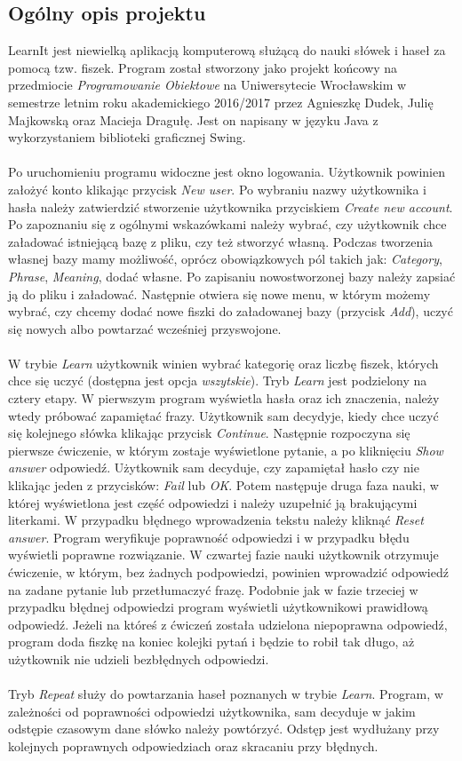 \documentclass[11pt]{article}
\begin{document}
\subsection{Ogólny opis projektu}
LearnIt jest niewielką aplikacją komputerową służącą do nauki słówek i haseł za pomocą tzw. fiszek. Program został stworzony jako projekt końcowy na przedmiocie \textit{Programowanie Obiektowe} na Uniwersytecie Wrocławskim w semestrze letnim roku akademickiego 2016/2017 przez Agnieszkę Dudek, Julię Majkowską oraz Macieja Dragułę. Jest on napisany w języku Java z wykorzystaniem biblioteki graficznej Swing. \\\\
Po uruchomieniu programu widoczne jest okno logowania. Użytkownik powinien założyć konto klikając przycisk \textit{New user}. Po wybraniu nazwy użytkownika i hasła należy zatwierdzić stworzenie użytkownika przyciskiem \textit{Create new account}. Po zapoznaniu się z ogólnymi wskazówkami należy wybrać, czy użytkownik chce załadować istniejącą bazę z pliku, czy też stworzyć własną. Podczas tworzenia własnej bazy mamy możliwość, oprócz obowiązkowych pól takich jak: \textit{Category}, \textit{Phrase}, \textit{Meaning}, dodać własne. Po zapisaniu nowostworzonej bazy należy zapsiać ją do pliku i załadować. Następnie otwiera się nowe menu, w którym możemy wybrać, czy chcemy dodać nowe fiszki do załadowanej bazy (przycisk \textit{Add}), uczyć się nowych albo powtarzać wcześniej przyswojone. \\\\
W trybie \textit{Learn} użytkownik winien wybrać kategorię oraz liczbę fiszek, których chce się uczyć (dostępna jest opcja \textit{wszytskie}). Tryb \textit{Learn} jest podzielony na cztery etapy. W pierwszym program wyświetla hasła oraz ich znaczenia, należy wtedy próbować zapamiętać frazy. Użytkownik sam decydyje, kiedy chce uczyć się kolejnego słówka klikając przycisk \textit{Continue}. Następnie rozpoczyna się pierwsze ćwiczenie, w którym zostaje wyświetlone pytanie, a po kliknięciu \textit{Show answer} odpowiedź. Użytkownik sam decyduje, czy zapamiętał hasło czy nie klikając jeden z przycisków: \textit{Fail} lub \textit{OK}. Potem następuje druga faza nauki, w której wyświetlona jest część odpowiedzi i należy uzupełnić ją brakującymi literkami. W przypadku błędnego wprowadzenia tekstu należy kliknąć \textit{Reset answer}. Program weryfikuje poprawność odpowiedzi i w przypadku błędu wyświetli poprawne rozwiązanie. W czwartej fazie nauki użytkownik otrzymuje ćwiczenie, w którym, bez żadnych podpowiedzi, powinien wprowadzić odpowiedź na zadane pytanie lub przetłumaczyć frazę. Podobnie jak w fazie trzeciej w przypadku błędnej odpowiedzi program wyświetli użytkownikowi prawidłową odpowiedź. Jeżeli na któreś z ćwiczeń została udzielona niepoprawna odpowiedź, program doda fiszkę na koniec kolejki pytań i będzie to robił tak długo, aż użytkownik nie udzieli bezbłędnych odpowiedzi.\\\\
Tryb \textit{Repeat} służy do powtarzania haseł poznanych w trybie \textit{Learn}. Program, w zależności od poprawności odpowiedzi użytkownika, sam decyduje w jakim odstępie czasowym dane słówko należy powtórzyć. Odstęp jest wydłużany przy kolejnych poprawnych odpowiedziach oraz skracaniu przy błędnych.
\end{document}
